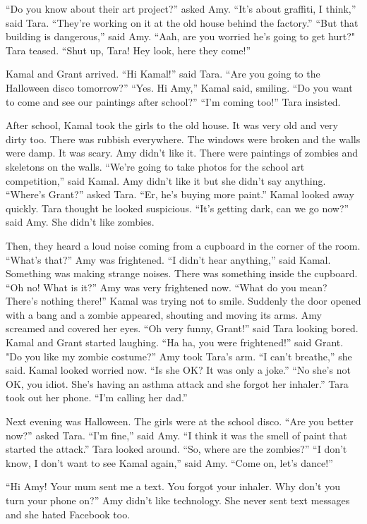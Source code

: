 “Do you know about their art project?” asked Amy. “It’s about graffiti, I think,” said Tara. “They’re working on it at the old house behind the factory.” “But that building is dangerous,” said Amy. “Aah, are you worried he’s going to get hurt?" Tara teased. “Shut up, Tara! Hey look, here they come!”

Kamal and Grant arrived. “Hi Kamal!” said Tara. “Are you going to the Halloween disco tomorrow?” “Yes. Hi Amy,” Kamal said, smiling. “Do you want to come and see our paintings after school?” “I’m coming too!” Tara insisted.

After school, Kamal took the girls to the old house. It was very old and very dirty too. There was rubbish everywhere. The windows were broken and the walls were damp. It was scary. Amy didn’t like it. There were paintings of zombies and skeletons on the walls. “We’re going to take photos for the school art competition,” said Kamal. Amy didn’t like it but she didn’t say anything. “Where’s Grant?” asked Tara. “Er, he’s buying more paint.” Kamal looked away quickly. Tara thought he looked suspicious. “It’s getting dark, can we go now?” said Amy. She didn’t like zombies.

Then, they heard a loud noise coming from a cupboard in the corner of the room. “What’s that?” Amy was frightened. “I didn’t hear anything,” said Kamal. Something was making strange noises. There was something inside the cupboard. “Oh no! What is it?” Amy was very frightened now. “What do you mean? There’s nothing there!” Kamal was trying not to smile. Suddenly the door opened with a bang and a zombie appeared, shouting and moving its arms. Amy screamed and covered her eyes. “Oh very funny, Grant!” said Tara looking bored. Kamal and Grant started laughing. “Ha ha, you were frightened!” said Grant. "Do you like my zombie costume?” Amy took Tara’s arm. “I can’t breathe,” she said. Kamal looked worried now. “Is she OK? It was only a joke.” “No she’s not OK, you idiot. She’s having an asthma attack and she forgot her inhaler.” Tara took out her phone. “I’m calling her dad.”

Next evening was Halloween. The girls were at the school disco. “Are you better now?” asked Tara. “I’m fine,” said Amy. “I think it was the smell of paint that started the attack.” Tara looked around. “So, where are the zombies?” “I don’t know, I don’t want to see Kamal again,” said Amy. “Come on, let’s dance!”

“Hi Amy! Your mum sent me a text. You forgot your inhaler. Why don’t you turn your phone on?” Amy didn’t like technology. She never sent text messages and she hated Facebook too.

